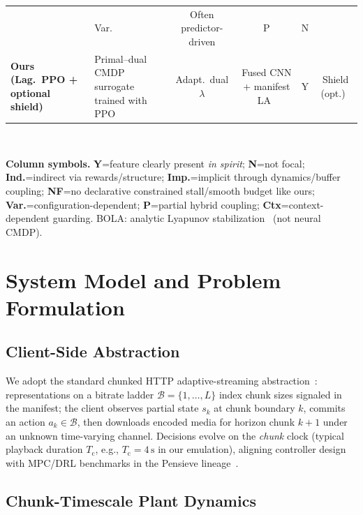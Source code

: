 \documentclass[preprint,12pt]{elsarticle}
\begin{document}
\begin{table}[!t]
\begin{tabular}{@{} >{\raggedright\arraybackslash}p{22mm}
                     >{\raggedright\arraybackslash}p{33mm}
                     c c c c @{}}
        & Var.\ & Often predictor-driven & P & N \\
    \textbf{Ours (Lag.\ PPO + optional shield)}
        & Primal--dual CMDP surrogate trained with PPO~\cite{paternain2019dual,schulman2017proximal}
        & Adapt.\ dual $\lambda$ & Fused CNN + manifest LA~\cite{sodagar2011mpeg,mao2017neural}
        & Y & Shield (opt.)~\cite{alshiekh2018shielding} \\
    \bottomrule
    \end{tabular}\\[6pt]
    \begin{minipage}{\textwidth}
    \footnotesize
    \raggedright
    \textbf{Column symbols.}
    \textbf{Y}=feature clearly present \emph{in spirit}; \textbf{N}=not focal; \textbf{Ind.}=indirect via rewards/structure;
    \textbf{Imp.}=implicit through dynamics/buffer coupling; \textbf{NF}=no declarative constrained stall/smooth budget like ours;
    \textbf{Var.}=configuration-dependent; \textbf{P}=partial hybrid coupling; \textbf{Ctx}=context-dependent guarding.
    BOLA: analytic Lyapunov stabilization~\cite{spiteri2018bola} (not neural CMDP).
    \end{minipage}
\end{table}

\section{System Model and Problem Formulation}
\label{sec:system}

\subsection{Client-Side Abstraction}
We adopt the standard chunked HTTP adaptive-streaming abstraction~\cite{yin2015control,mao2017neural,sodagar2011mpeg}: representations on a bitrate ladder \(\mathcal{B}=\{1,\ldots,L\}\) index chunk sizes signaled in the manifest; the client observes partial state \(s_k\) at chunk boundary \(k\), commits an action \(a_k\in\mathcal{B}\), then downloads encoded media for horizon chunk \(k{+}1\) under an unknown time-varying channel.
Decisions evolve on the \emph{chunk} clock (typical playback duration \(T_{\mathrm{c}}\), e.g., \(T_{\mathrm{c}}{=}4\,\mathrm{s}\) in our emulation), aligning controller design with MPC/DRL benchmarks in the Pensieve lineage~\cite{mao2017neural,yin2015control}.

\subsection{Chunk-Timescale Plant Dynamics}
\end{document}
